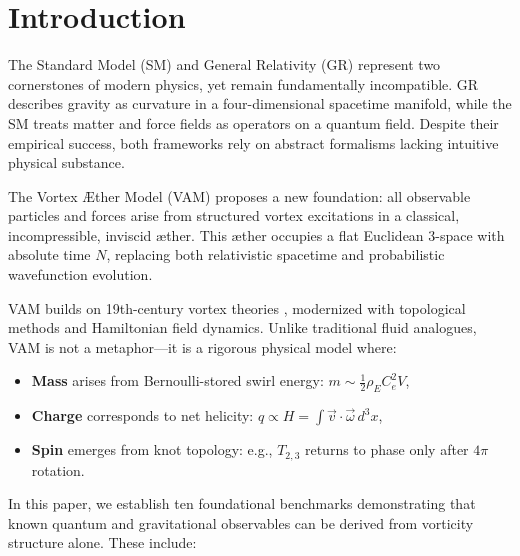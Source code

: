 \documentclass[preprint]{revtex4-2}
\begin{document}
    \maketitle



        \section{Introduction}

The Standard Model (SM) and General Relativity (GR) represent two cornerstones of modern physics, yet remain fundamentally incompatible. GR describes gravity as curvature in a four-dimensional spacetime manifold, while the SM treats matter and force fields as operators on a quantum field. Despite their empirical success, both frameworks rely on abstract formalisms lacking intuitive physical substance.

The Vortex \AE{}ther Model (VAM) proposes a new foundation: all observable particles and forces arise from structured vortex excitations in a classical, incompressible, inviscid æther. This æther occupies a flat Euclidean 3-space with absolute time \( N \), replacing both relativistic spacetime and probabilistic wavefunction evolution.

VAM builds on 19th-century vortex theories \cite{helmholtz1858integrals, thomson1867vortex}, modernized with topological methods and Hamiltonian field dynamics. Unlike traditional fluid analogues, VAM is not a metaphor—it is a rigorous physical model where:

\begin{itemize}
    \item \textbf{Mass} arises from Bernoulli-stored swirl energy: \( m \sim \frac{1}{2} \rho_{\scriptscriptstyle\boldsymbol\!E}C_e^2 V \),
    \item \textbf{Charge} corresponds to net helicity: \( q \propto H = \int \vec{v} \cdot \vec{\omega} \, d^3x \),
    \item \textbf{Spin} emerges from knot topology: e.g., \( T_{2,3} \) returns to phase only after \( 4\pi \) rotation.
\end{itemize}

In this paper, we establish ten foundational benchmarks demonstrating that known quantum and gravitational observables can be derived from vorticity structure alone. These include:
\end{document}
